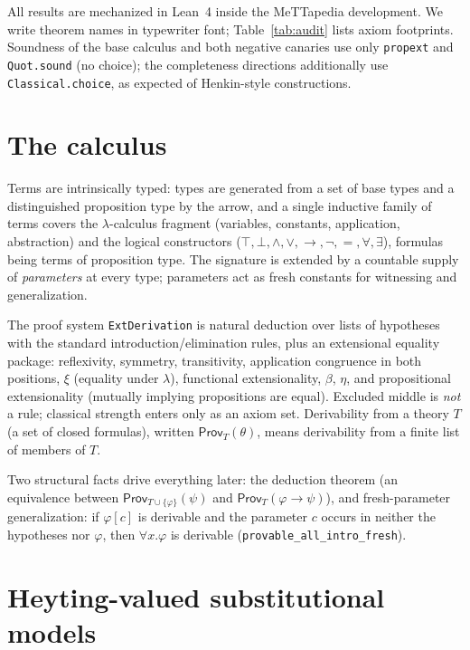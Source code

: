 \documentclass[11pt]{article}
\newcommand{\code}[1]{\texttt{#1}}
\newcommand{\Prov}{\mathsf{Prov}}
\theoremstyle{plain}
\theoremstyle{definition}
\begin{document}
All results are mechanized in Lean~4 inside the MeTTapedia development.  We
write theorem names in typewriter font; Table~\ref{tab:audit} lists axiom
footprints.  Soundness of the base calculus and both negative canaries use
only \code{propext} and \code{Quot.sound} (no choice); the completeness
directions additionally use \code{Classical.choice}, as expected of
Henkin-style constructions.

\section{The calculus}\label{sec:calculus}

Terms are intrinsically typed: types are generated from a set of base types
and a distinguished proposition type by the arrow, and a single inductive
family of terms covers the $\lambda$-calculus fragment (variables, constants,
application, abstraction) and the logical constructors
($\top,\bot,\wedge,\vee,\to,\neg,=,\forall,\exists$), formulas being terms of
proposition type.  The signature is extended by a countable supply of
\emph{parameters} at every type; parameters act as fresh constants for
witnessing and generalization.

The proof system \code{ExtDerivation} is natural deduction over lists of
hypotheses with the standard introduction/elimination rules, plus an
extensional equality package: reflexivity, symmetry, transitivity,
application congruence in both positions, $\xi$ (equality under $\lambda$),
functional extensionality, $\beta$, $\eta$, and propositional extensionality
(mutually implying propositions are equal).  Excluded middle is \emph{not} a
rule; classical strength enters only as an axiom set.  Derivability from a
theory $T$ (a set of closed formulas), written $\Prov_T(\theta)$, means
derivability from a finite list of members of $T$.

Two structural facts drive everything later: the deduction theorem (an
equivalence between $\Prov_{T\cup\{\varphi\}}(\psi)$ and
$\Prov_T(\varphi\to\psi)$), and fresh-parameter generalization: if
$\varphi[c]$ is derivable and the parameter $c$ occurs in neither the
hypotheses nor $\varphi$, then $\forall x.\varphi$ is derivable
(\code{provable\_all\_intro\_fresh}).

\section{Heyting-valued substitutional models}\label{sec:models}
\end{document}
